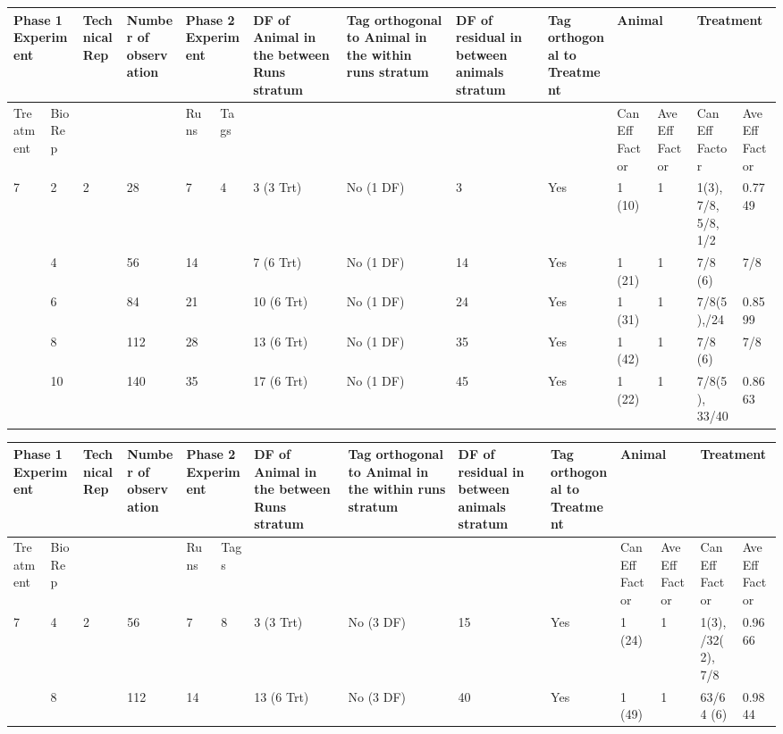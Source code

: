 \begin{tabular}{|p{0.5in}|p{0.3in}|p{0.5in}|p{0.7in}|p{0.3in}|p{0.3in}|p{0.7in}|p{0.7in}|p{0.6in}|p{0.6in}|p{0.4in}|p{0.4in}|p{0.5in}|p{0.4in}|} \hline 
\multicolumn{2}{|p{1in}|}{Phase 1 Experiment} & Technical Rep & Number of observation  & \multicolumn{2}{|p{0.7in}|}{Phase 2 Experiment} & DF of Animal in the between Runs stratum  & Tag orthogonal to Animal in the within runs stratum & DF of residual in between animals stratum & Tag orthogonal to Treatment & \multicolumn{2}{|p{0.8in}|}{Animal} & \multicolumn{2}{|p{0.9in}|}{Treatment} \\ \hline 
Treatment & Bio Rep &  &  & Runs & Tags  &  &  &  &  & Can Eff Factor & Ave Eff Factor & Can Eff Factor & Ave Eff Factor \\ \hline 
7 & 2 & 2 & 28 & 7 & 4 & 3 (3 Trt) & No (1 DF) & 3 & Yes & 1 (10) & 1 & 1(3), 7/8, 5/8, 1/2 & 0.7749 \\ \hline 
 & 4 &  & 56 & 14 &  & 7 (6 Trt) & No (1 DF) & 14 & Yes & 1 (21) & 1 & 7/8 (6) & 7/8 \\ \hline 
 & 6 &  & 84 & 21 &  & 10 (6 Trt) & No (1 DF) & 24 & Yes & 1 (31) & 1 & 7/8(5),\newline 19/24 & 0.8599 \\ \hline 
 & 8 &  & 112 & 28 &  & 13 (6 Trt) & No (1 DF) & 35 & Yes & 1 (42) & 1 & 7/8 (6) & 7/8 \\ \hline 
 & 10 &  & 140 & 35 &  & 17 (6 Trt) & No (1 DF) & 45 & Yes & 1 (22) & 1 & 7/8(5), 33/40 & 0.8663 \\ \hline 
\end{tabular}



\noindent 

\begin{tabular}{|p{0.5in}|p{0.3in}|p{0.5in}|p{0.7in}|p{0.3in}|p{0.3in}|p{0.7in}|p{0.7in}|p{0.6in}|p{0.6in}|p{0.4in}|p{0.4in}|p{0.5in}|p{0.4in}|} \hline 
\multicolumn{2}{|p{1in}|}{Phase 1 Experiment} & Technical Rep & Number of observation  & \multicolumn{2}{|p{0.7in}|}{Phase 2 Experiment} & DF of Animal in the between Runs stratum  & Tag orthogonal to Animal in the within runs stratum & DF of residual in between animals stratum & Tag orthogonal to Treatment & \multicolumn{2}{|p{0.8in}|}{Animal} & \multicolumn{2}{|p{0.9in}|}{Treatment} \\ \hline 
Treatment & Bio Rep &  &  & Runs & Tags  &  &  &  &  & Can Eff Factor & Ave Eff Factor & Can Eff Factor & Ave Eff Factor \\ \hline 
7 & 4 & 2 & 56 & 7 & 8 & 3 (3 Trt) & No (3 DF) & 15 & Yes & 1 (24) & 1 & 1(3),\newline 31/32(2), 7/8 & 0.9666 \\ \hline 
 & 8 &  & 112 & 14 &  & 13 (6 Trt) & No (3 DF) & 40 & Yes & 1 (49) & 1 & 63/64 (6)\newline  & 0.9844 \\ \hline 
\end{tabular}



